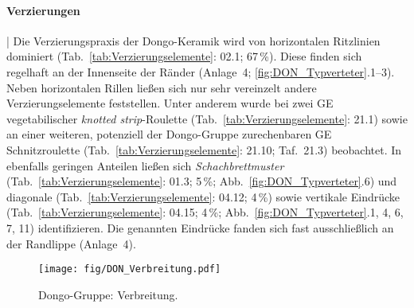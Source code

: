\paragraph{Verzierungen}\hspace{-.5em}|\hspace{.5em}%
Die Verzierungspraxis der Dongo-Keramik wird von horizontalen Ritzlinien dominiert (Tab.~\ref{tab:Verzierungselemente}: 02.1; 67\,\%). Diese finden sich regelhaft an der Innenseite der Ränder (Anlage~4; \ref{fig:DON_Typverteter}.1--3). Neben horizontalen Rillen ließen sich nur sehr vereinzelt andere Verzierungselemente feststellen. Unter anderem wurde bei zwei GE vegetabilischer \textit{knotted strip}-Roulette (Tab.~\ref{tab:Verzierungselemente}: 21.1) sowie an einer weiteren, potenziell der Dongo-Gruppe zurechenbaren GE Schnitzroulette (Tab.~\ref{tab:Verzierungselemente}: 21.10; Taf.~21.3) beobachtet. In ebenfalls geringen Anteilen ließen sich \textit{Schachbrettmuster} (Tab.~\ref{tab:Verzierungselemente}: 01.3; 5\,\%; Abb.~\ref{fig:DON_Typverteter}.6) und diagonale (Tab.~\ref{tab:Verzierungselemente}: 04.12; 4\,\%) sowie vertikale Eindrücke (Tab.~\ref{tab:Verzierungselemente}: 04.15; 4\,\%; Abb.~\ref{fig:DON_Typverteter}.1, 4, 6, 7, 11)  identifizieren. Die genannten Eindrücke fanden sich fast ausschließlich an der Randlippe (Anlage~4).

\begin{figure*}[p]
	\centering
	\texttt{[image: fig/DON\_Verbreitung.pdf]}
	\caption{Dongo-Gruppe: Verbreitung.}
	\label{fig:DON_Verbreitung}
\end{figure*}

